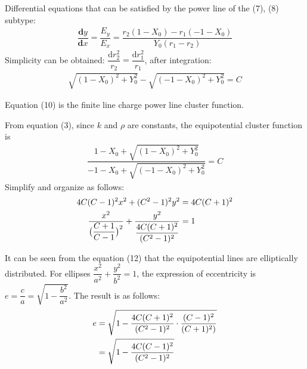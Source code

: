 \documentclass[journal,twocolumn,letterpaper]{IEEEJERM}
\begin{document}
Differential equations that can be satisfied by the power line of the (7), (8) subtype:
\begin{align}
\dfrac{\mathbf{d}y}{\mathbf{d}x}=\dfrac{E_y}{E_x}=\dfrac{r_2(1-X_0)-r_1(-1-X_0)}{Y_0(r_1-r_2)}
\end{align}
Simplicity can be obtained: $\dfrac{\mathrm{d}r_2^2}{r_2}=\dfrac{\mathrm{d}r_1^2}{r_1}$, after integration:
\begin{align}
\sqrt{(1-X_0)^2+Y_0^2}-\sqrt{(-1-X_0)^2+Y_0^2}=C
\end{align}

Equation (10) is the finite line charge power line cluster function.

From equation (3), since $k$ and $\rho$ are constants, the equipotential cluster function is
\begin{align}
\dfrac{1-X_0+\sqrt{(1-X_0)^2+Y_0^2}}{-1-X_0+\sqrt{(-1-X_0)^2+Y_0^2}}=C
\end{align}
Simplify and organize as follows:
\begin{align}
4C(C-1)^2x^2+(C^2-1)^2y^2&=4C(C+1)^2 \notag \\
\dfrac{x^2}{\big( \dfrac{C+1}{C-1}  \big)^2}+\dfrac{y^2}{\dfrac{4C(C+1)^2}{(C^2-1)^2}}&=1
\end{align}

It can be seen from the equation (12) that the equipotential lines are elliptically distributed. For ellipses $\dfrac{x^2}{a^2}+\dfrac{y^2}{b^2}=1$, the expression of eccentricity is $e=\dfrac{c}{a}=\sqrt{1-\dfrac{b^2}{a^2}}$. The result is as follows:
\begin{align}
e&=\sqrt{1-\dfrac{4C(C+1)^2}{(C^2-1)^2}\cdot\dfrac{(C-1)^2}{(C+1)^2)}}\notag \\
&=\sqrt{1-\dfrac{4C(C-1)^2}{(C^2-1)^2}}
\end{align}
\end{document}
